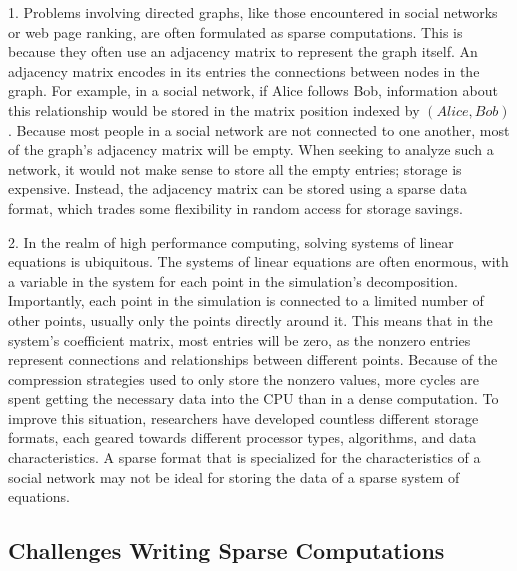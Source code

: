 1.
Problems involving directed graphs, like those encountered in social networks or web page ranking, are often formulated as sparse computations. 
This is because they often use an adjacency matrix to represent the graph itself.
An adjacency matrix encodes in its entries the connections between nodes in the graph. 
For example, in a social network, if Alice follows Bob, information about this relationship would be stored in the matrix position indexed by $(Alice,Bob)$. 
Because most people in a social network are not connected to one another, most of the graph's adjacency matrix will be empty.
When seeking to analyze such a network, it would not make sense to store all the empty entries; storage is expensive.
Instead, the adjacency matrix can be stored using a sparse data format, which trades some flexibility in random access for storage savings.

2. 
In the realm of high performance computing, solving systems of linear equations is ubiquitous.
The systems of linear equations are often enormous, with a variable in the system for each point in the simulation's decomposition.
Importantly, each point in the simulation is connected to a limited number of other points, usually only the points directly around it.
This means that in the system's coefficient matrix, most entries will be zero, as the nonzero entries represent connections and relationships between different points.
Because of the compression strategies used to only store the nonzero values, more cycles are spent getting the necessary data into the CPU than in a dense computation.
To improve this situation, researchers have developed countless different storage formats, each geared towards different processor types, algorithms, and data characteristics.
A sparse format that is specialized for the characteristics of a social network may not be ideal for storing the data of a sparse system of equations.

\subsection{Challenges Writing Sparse Computations}

